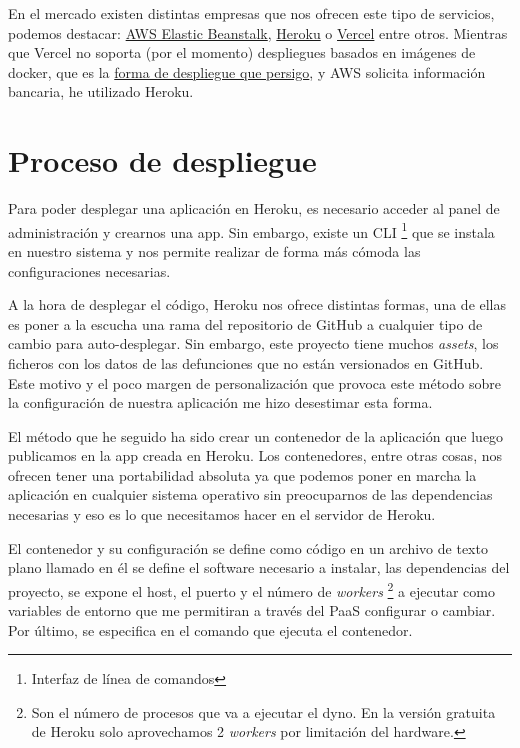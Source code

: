 En el mercado existen distintas empresas que nos ofrecen este tipo de servicios, podemos
destacar: \href{https://aws.amazon.com/es/elasticbeanstalk/}{AWS Elastic Beanstalk},
\href{https://dashboard.heroku.com/login}{Heroku} o \href{https://vercel.com/}{Vercel}
entre otros. Mientras que Vercel no soporta (por el momento) despliegues basados en imágenes de docker,
que es la \hyperref[sec:proceso-despliegue]{forma de despliegue que persigo}, y AWS
solicita información bancaria, he utilizado Heroku.

\section{Proceso de despliegue}
\label{sec:proceso-despliegue}
Para poder desplegar una aplicación en Heroku, es necesario acceder al panel de
administración y crearnos una app. Sin embargo, existe un CLI \footnote{Interfaz de
línea de comandos} que se instala en nuestro sistema y nos permite realizar de forma más
cómoda las configuraciones necesarias.

A la hora de desplegar el código, Heroku nos ofrece distintas formas, una de ellas es
poner a la escucha una rama del repositorio de GitHub a cualquier tipo de cambio para
auto-desplegar. Sin embargo, este proyecto tiene muchos \textit{assets}, los ficheros con
los datos de las defunciones que no están versionados en GitHub. Este
motivo y el poco margen de personalización que provoca este método sobre la
configuración de nuestra aplicación me hizo desestimar esta forma.

El método que he seguido ha sido crear un contenedor de la aplicación que luego publicamos
en la app creada en Heroku. Los contenedores, entre otras cosas, nos ofrecen tener una portabilidad absoluta
ya que podemos poner en marcha la aplicación en cualquier sistema operativo sin
preocuparnos de las dependencias necesarias y eso es lo que necesitamos hacer en el
servidor de Heroku.

El contenedor y su configuración se define como código en un archivo de texto plano
llamado  en él se define el software necesario a instalar, las
dependencias del proyecto, se expone el host, el puerto y el número de \textit{workers}
\footnote{Son el número de procesos que va a ejecutar el dyno. En la versión gratuita de Heroku solo aprovechamos 2 \textit{workers} por
limitación del hardware.} a
ejecutar como variables de entorno que me permitiran a través del PaaS configurar o cambiar.
Por último, se especifica en el comando que ejecuta el contenedor.

